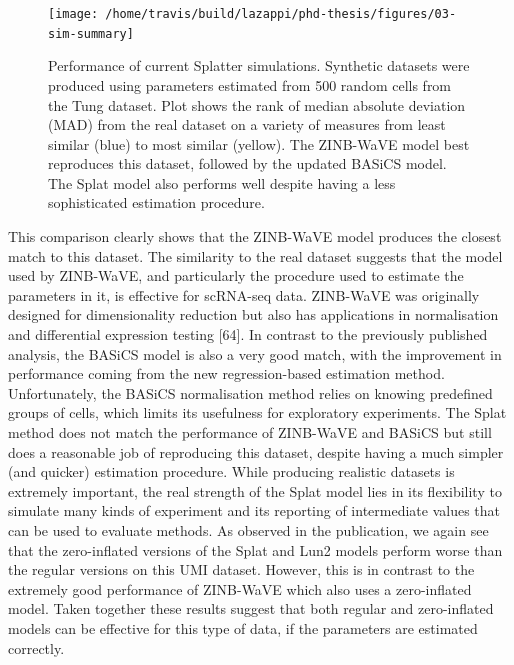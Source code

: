 \documentclass[11pt,a4paper,titlepage,twoside,openright]{style/unimelbthesis}
\theoremstyle{definition}
\theoremstyle{definition}
\theoremstyle{definition}
\theoremstyle{remark}
\begin{document}
\begin{mainmatter}
\begin{figure}

{\centering \texttt{[image: /home/travis/build/lazappi/phd-thesis/figures/03-sim-summary]} 

}

\caption[Performance of current Splatter simulations.]{Performance of current Splatter simulations. Synthetic datasets were produced using parameters estimated from 500 random cells from the Tung dataset. Plot shows the rank of median absolute deviation (MAD) from the real dataset on a variety of measures from least similar (blue) to most similar (yellow). The ZINB-WaVE model best reproduces this dataset, followed by the updated BASiCS model. The Splat model also performs well despite having a less sophisticated estimation procedure.}\label{fig:simulation-summary}
\end{figure}





This comparison clearly shows that the ZINB-WaVE model produces the closest match to this dataset. The similarity to the real dataset suggests that the model used by ZINB-WaVE, and particularly the procedure used to estimate the parameters in it, is effective for scRNA-seq data. ZINB-WaVE was originally designed for dimensionality reduction but also has applications in normalisation and differential expression testing {[}64{]}. In contrast to the previously published analysis, the BASiCS model is also a very good match, with the improvement in performance coming from the new regression-based estimation method. Unfortunately, the BASiCS normalisation method relies on knowing predefined groups of cells, which limits its usefulness for exploratory experiments. The Splat method does not match the performance of ZINB-WaVE and BASiCS but still does a reasonable job of reproducing this dataset, despite having a much simpler (and quicker) estimation procedure. While producing realistic datasets is extremely important, the real strength of the Splat model lies in its flexibility to simulate many kinds of experiment and its reporting of intermediate values that can be used to evaluate methods. As observed in the publication, we again see that the zero-inflated versions of the Splat and Lun2 models perform worse than the regular versions on this UMI dataset. However, this is in contrast to the extremely good performance of ZINB-WaVE which also uses a zero-inflated model. Taken together these results suggest that both regular and zero-inflated models can be effective for this type of data, if the parameters are estimated correctly.


\end{mainmatter}
\end{document}
